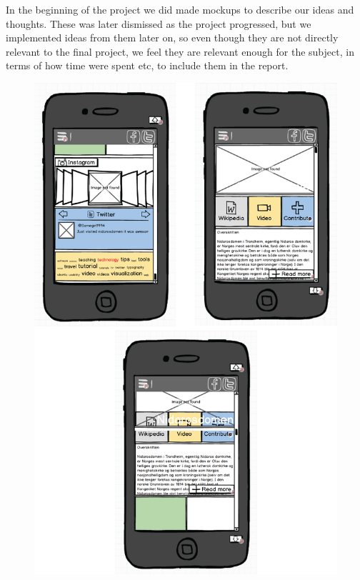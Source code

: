 \documentclass[12pt,a4paper,titlepage]{article}
\begin{document}
\begin{appendices}
In the beginning of the project we did made mockups to describe our ideas and thoughts. These was later dismissed as the project progressed, but we implemented ideas from them later on, so even though they are not directly relevant to the final project, we feel they are relevant enough for the subject, in terms of how time were spent etc, to include them in the report.

\begin{figure}[!h]
\centering
\includegraphics[width=0.9 \textwidth] {res/mockup1.png}
\end{figure}


\end{appendices}
\end{document}
